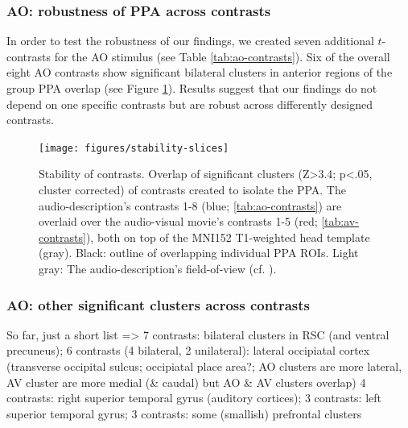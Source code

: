 \documentclass[english]{article}
\begin{document}
\subsubsection{AO: robustness of PPA across contrasts}



In order to test the robustness of our findings, we created seven additional
$t$-contrasts for the AO stimulus (see Table \ref{tab:ao-contrasts}).
Six of the overall eight AO contrasts show significant bilateral clusters in
anterior regions of the group PPA overlap (see Figure
\ref{fig:stability-slices}).
Results suggest that our findings do not depend on one specific contrasts but
are robust across differently designed contrasts.
%

\begin{figure} \centering
    \texttt{[image: figures/stability-slices]}
    \caption{Stability of contrasts. Overlap of significant clusters (Z>3.4;
        p<.05, cluster corrected) of contrasts created to isolate the PPA.
        The audio-description's contrasts 1-8 (blue; \ref{tab:ao-contrasts})
        are overlaid over the audio-visual movie's contrasts 1-5 (red;
        \ref{tab:av-contrasts}), both on top of the MNI152 T1-weighted head
        template (gray).
        Black: outline of overlapping individual PPA ROIs.
        Light gray: The audio-description's field-of-view (cf.
        \citep{hanke2014audiomovie}).}
    \label{fig:stability-slices}
    \end{figure}


\subsubsection{AO: other significant clusters across contrasts}
So far, just a short list => 7 contrasts: bilateral clusters in RSC (and ventral
precuneus);
6 contrasts (4 bilateral, 2 unilateral): lateral occipiatal cortex (transverse
occipital sulcus; occipiatal place area?; AO clusters are more lateral, AV
cluster are more medial (\& caudal) but AO \& AV clusters overlap)
4 contrasts: right superior temporal gyrus (auditory cortices); 3 contrasts:
left superior temporal gyrus; 3 contrasts: some (smallish) prefrontal clusters
\end{document}

